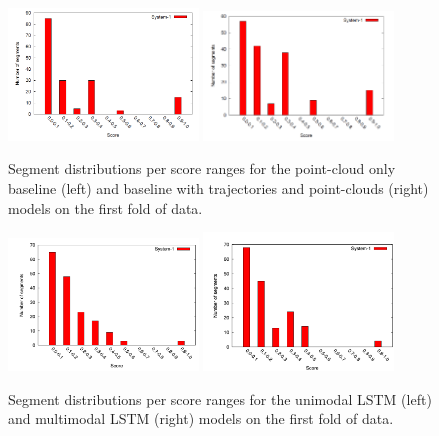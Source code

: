 \documentclass[letterpaper, 12 pt, conference]{ieeeconf}
\begin{document}
\begin{figure}[htb!]
  \centering
  \includegraphics[width=0.45\textwidth]{baseline_score}
  \includegraphics[width=0.45\textwidth]{baseline_w_traj_score}
  \caption{Segment distributions per score ranges for the point-cloud only baseline (left) and baseline with trajectories and point-clouds (right) models on the first fold of data.}
  \label{fig:baselines_fold_1_score}
\end{figure}

\begin{figure}[htb!]
  \centering
  \includegraphics[width=0.45\textwidth]{lstm_fold_1_score_bar_graph}
  \includegraphics[width=0.45\textwidth]{multimodal_lstm_results}
  \caption{Segment distributions per score ranges for the unimodal LSTM (left) and multimodal LSTM (right) models on the first fold of data.}
  \label{fig:fold_1_score_lstms}
\end{figure}
\end{document}
